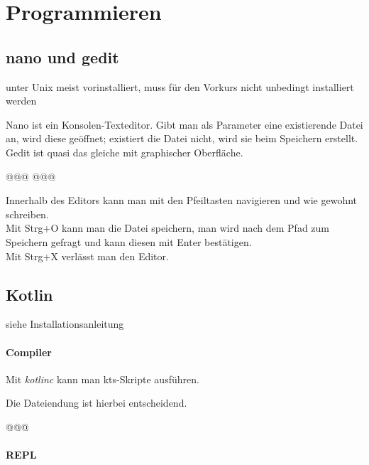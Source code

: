 \section{Programmieren}
\subsection{nano und gedit}
\begin{defBox}
     unter Unix meist vorinstalliert, muss für den Vorkurs nicht unbedingt installiert werden
\end{defBox}
Nano ist ein Konsolen-Texteditor. Gibt man als Parameter eine existierende Datei an, wird diese geöffnet; existiert die Datei nicht, wird sie beim Speichern erstellt. Gedit ist quasi das gleiche mit graphischer Oberfläche.
\begin{commandshell}
@\shellprefix@nano @\textit{}@
@\shellprefix@gedit @\textit{}@
\end{commandshell}
Innerhalb des Editors kann man mit den Pfeiltasten navigieren und wie gewohnt schreiben.\\
Mit Strg+O kann man die Datei speichern, man wird nach dem Pfad zum Speichern gefragt und kann diesen mit Enter bestätigen.\\
Mit Strg+X verlässt man den Editor.

\subsection{Kotlin}
\begin{defBox}
     siehe Installationsanleitung
\end{defBox}
\paragraph*{Compiler}\mbox{}

Mit \textit{kotlinc} kann man kts-Skripte ausführen.
\begin{defBox}
     Die Dateiendung ist hierbei entscheidend.
\end{defBox}

\begin{commandshell}
    @\shellprefix@kotlinc @\textit{}@
\end{commandshell}

\clearpage
\paragraph*{REPL}\mbox{}

